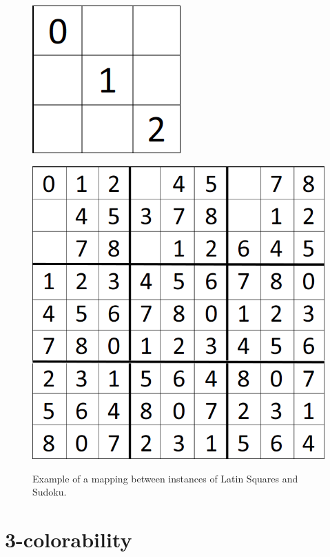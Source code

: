 \documentclass[runningheads,a4paper]{llncs}
\begin{document}
\begin{figure}[H]
\begin{minipage}{0.45\textwidth}
\includegraphics[scale=0.25]{sudoku-3.png}
\label{fig:partialNP}
\end{minipage}
\hfill
\begin{minipage}{0.45\textwidth}
\centering
\label{fig:partialLS}
\includegraphics[scale=0.25]{sudoku-1.png}
\end{minipage}
\caption{Example of a mapping between instances of Latin Squares and Sudoku.}
\end{figure}

\section{3-colorability}
\end{document}
